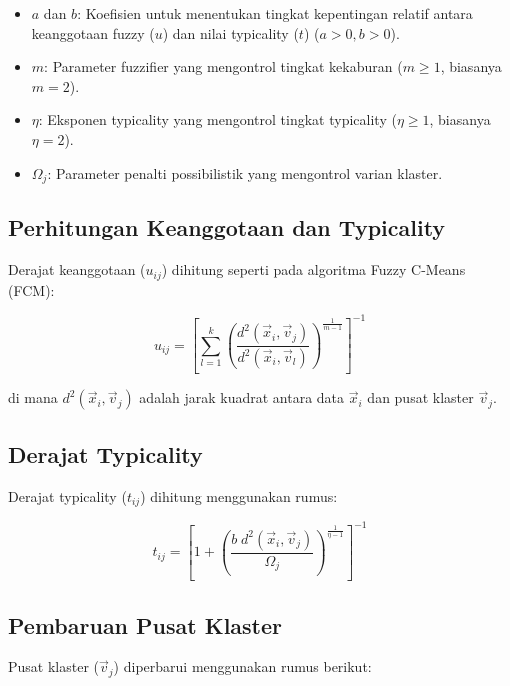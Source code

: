 \documentclass[
  oneside]{book}
\begin{document}
\begin{itemize}
\item
  \(a\) dan \(b\): Koefisien untuk menentukan tingkat kepentingan relatif antara keanggotaan fuzzy (\(u\)) dan nilai typicality (\(t\)) (\(a > 0, b > 0\)).
\item
  \(m\): Parameter fuzzifier yang mengontrol tingkat kekaburan (\(m \geq 1\), biasanya \(m = 2\)).
\item
  \(\eta\): Eksponen typicality yang mengontrol tingkat typicality (\(\eta \geq 1\), biasanya \(\eta = 2\)).
\item
  \(\Omega_j\): Parameter penalti possibilistik yang mengontrol varian klaster.
\end{itemize}

\subsection*{Perhitungan Keanggotaan dan Typicality}\label{perhitungan-keanggotaan-dan-typicality}

Derajat keanggotaan (\(u_{ij}\)) dihitung seperti pada algoritma Fuzzy C-Means (FCM):

\[
u_{ij} = \left[\sum_{l=1}^k \left(\frac{d^2(\vec{x}_i, \vec{v}_j)}{d^2(\vec{x}_i, \vec{v}_l)}\right)^{\frac{1}{m-1}}\right]^{-1}
\]

di mana \(d^2(\vec{x}_i, \vec{v}_j)\) adalah jarak kuadrat antara data \(\vec{x}_i\) dan pusat klaster \(\vec{v}_j\).

\subsection*{Derajat Typicality}\label{derajat-typicality}

Derajat typicality (\(t_{ij}\)) dihitung menggunakan rumus:

\[
t_{ij} = \left[1 + \left(\frac{b \; d^2(\vec{x}_i, \vec{v}_j)}{\Omega_j}\right)^{\frac{1}{\eta-1}}\right]^{-1}
\]

\subsection*{Pembaruan Pusat Klaster}\label{pembaruan-pusat-klaster}

Pusat klaster (\(\vec{v}_j\)) diperbarui menggunakan rumus berikut:
\end{document}
